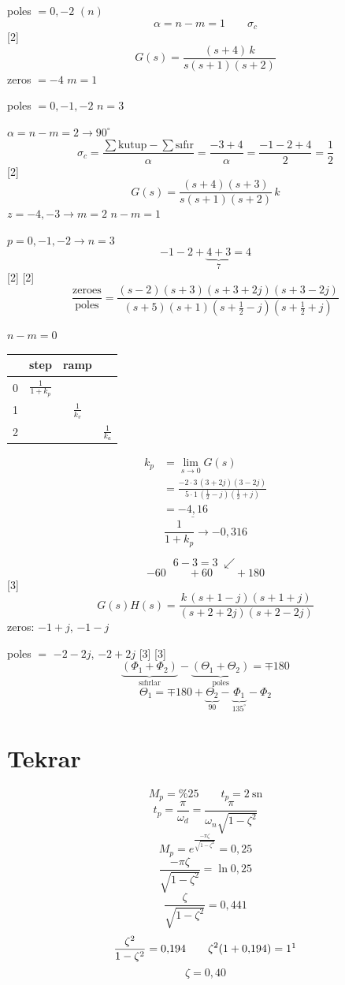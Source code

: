 \documentclass[11pt,a4paper]{article}
\begin{document}
poles $=0,-2$ \quad $(n)$
\[ \alpha = n-m = 1 \qquad \sigma_c \]
[2]
\[ G(s) = \frac{(s+4)\,k}{s(s+1)(s+2)} \]
zeros $=-4$ \quad $m=1$

poles $=0,-1,-2$ \quad $n=3$

$\alpha = n-m = 2 \rightarrow 90^\circ$
\[ \sigma_c = \frac{\sum \text{kutup} - \sum \text{sıfır}}{\alpha} = \frac{-3+4}{\alpha} = \frac{-1-2+4}{2} = \frac{1}{2} \]
[2]
\[ G(s) = \frac{(s+4)(s+3)}{s(s+1)(s+2)}\,k \]
$z=-4,-3 \rightarrow m=2$ \quad $n-m=1$

$p=0,-1,-2 \rightarrow n=3$
\[ -1-2+\underbrace{4+3}_{7} = 4 \]
[2]
[2]
\[ \frac{\text{zeroes}}{\text{poles}} = \frac{(s-2)(s+3)(s+3+2j)(s+3-2j)}{(s+5)(s+1)(s+\frac12-j)(s+\frac12+j)} \]

$n-m=0$

\begin{tabular}{c|c|c|c}
 & step & ramp & \\ \hline
0 & $\frac{1}{1+k_p}$ & & \\ \hline
1 & & $\frac{1}{k_v}$ & \\ \hline
2 & & & $\frac{1}{k_a}$
\end{tabular}
\begin{align*}
k_p &= \lim_{s\to 0} G(s)\\
&= \frac{-2\cdot 3\,(3+2j)(3-2j)}{5\cdot 1\,(\frac12-j)(\frac12+j)}\\
&= \underline{-4{,}16}
\end{align*}
\[ \frac{1}{1+k_p} \rightarrow -0{,}316 \]

\[ 6-3=3 \;\swarrow \]
\[ -60 \qquad +60 \qquad +180 \]
[3]
\[ G(s)H(s) = \frac{k\,(s+1-j)(s+1+j)}{(s+2+2j)(s+2-2j)} \]
zeros: $-1+j$, $-1-j$

poles $=$ $-2-2j$, $-2+2j$
[3]
[3]
\[ \underbrace{(\Phi_1+\Phi_2)}_{\text{sıfırlar}} - \underbrace{(\Theta_1+\Theta_2)}_{\text{poles}} = \mp 180 \]
\[ \Theta_1 = \mp 180 + \underbrace{\Theta_2}_{90} - \underbrace{\Phi_1}_{135^\circ} - \Phi_2 \]
\section{Tekrar}
\[ M_p = \%25 \qquad t_p = 2\ \mathrm{sn} \]
\[ t_p = \frac{\pi}{\omega_d} = \frac{\pi}{\omega_n\sqrt{1-\zeta^2}} \]
\[ M_p = e^{\frac{-\pi\zeta}{\sqrt{1-\zeta^2}}} = 0{,}25 \]
\[ \frac{-\pi\zeta}{\sqrt{1-\zeta^2}} = \ln 0{,}25 \]
\[ \frac{\zeta}{\sqrt{1-\zeta^2}} = 0{,}441 \]
\[ \frac{\zeta^2}{1-\zeta^2} = 0{,}194 \qquad \zeta^2(1+0{,}194) = 1\footnotemark \]
\[ \zeta = 0{,}40 \]
\end{document}
